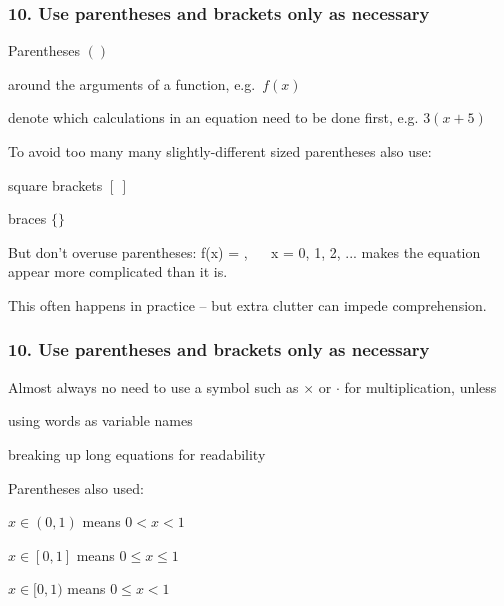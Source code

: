 
\begin{frame}
\frametitle{10. Use parentheses and brackets only as necessary}

Parentheses $()$
\bi
\item around the arguments of a function, e.g.~$f(x)$
\item denote which calculations in an equation need to be done first, e.g. $3 (x
  + 5)$
\ei

To avoid too many  many slightly-different sized parentheses also use:
\bi
\item square brackets $[~]$
\item braces $\{\}$
\ei

\pause

But don't overuse parentheses:
\eb
\nonumber f(x) = ,
  ~~ x = 0, 1, 2, ...
\ee
makes the equation appear more complicated than it is.

This often happens in practice -- but extra clutter can impede comprehension.

\end{frame}


\begin{frame}
\frametitle{10. Use parentheses and brackets only as necessary}

Almost always no need to use a symbol such as $\times$ or $\cdot$ for
multiplication, unless
\bi
\item using words as variable names
\item breaking up long equations for readability
\ei

\pause

Parentheses also used:
\bi
\item $x \in (0, 1)$ means $0 < x < 1$
\item $x \in [0, 1]$ means $0 \leq x \leq 1$
\item $x \in [0, 1)$ means $0 \leq x < 1$
\ei

\end{frame}


